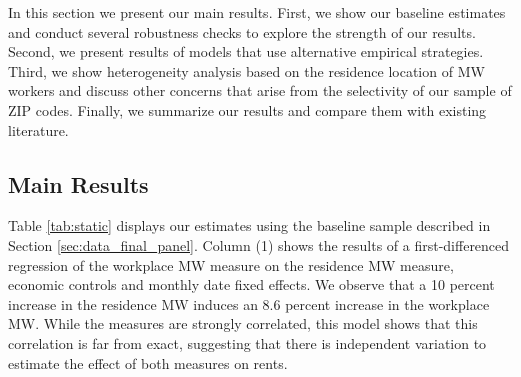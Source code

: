 
In this section we present our main results.
First, we show our baseline estimates and conduct several robustness checks to 
explore the strength of our results.
Second, we present results of models that use alternative empirical strategies.
Third, we show heterogeneity analysis based on the residence location of MW 
workers and discuss other concerns that arise from the selectivity of our 
sample of ZIP codes.
Finally, we summarize our results and compare them with existing literature.

\subsection{Main Results}
\label{sec:results_main}

Table \ref{tab:static} displays our estimates using the baseline sample 
described in Section \ref{sec:data_final_panel}.
Column (1) shows the results of a first-differenced regression of the workplace
MW measure on the residence MW measure, economic controls and monthly date fixed
effects.
We observe that a 10 percent increase in the residence MW induces an 
8.6 percent increase in the workplace MW.
While the measures are strongly correlated, this model shows that this 
correlation is far from exact, suggesting that there is independent variation
to estimate the effect of both measures on rents.


